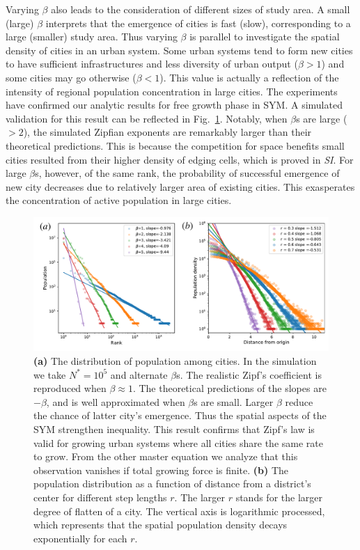 \documentclass[reprint,unsortedaddress,amsmath,amssymb,aps,prl,showkeys]{revtex4-2}
\begin{document}
Varying $\beta$ also leads to the consideration of different sizes of study area. A small (large) $\beta$ interprets that the emergence of cities is fast (slow), corresponding to a large (smaller) study area. %
Thus varying $\beta$ is parallel to investigate the spatial density of cities in an urban system. Some urban systems tend to form new cities to have sufficient infrastructures and less diversity of urban output\cite{batty2008size} ($\beta > 1$) and some cities may go otherwise ($\beta< 1$). This value is actually a reflection of the intensity of regional population concentration in large cities. The experiments have confirmed our analytic results for free growth phase in SYM. %
A simulated validation for this result can be reflected in Fig.~\ref{Fig2}. Notably, when $\beta$s are large ($>2$), the simulated Zipfian exponents are remarkably larger than their theoretical predictions. This is because the competition for space benefits small %
cities resulted from their higher density of edging cells, which is proved in \textit{SI}. For large $\beta$s, however, of the same rank, the probability of successful emergence of new city decreases due to relatively larger area of existing cities. This exasperates the concentration of active population in large cities.%
\begin{figure}[t]
	\centering
	\includegraphics[width = .99\linewidth]{pics/Zipf_Clark.pdf}
	\caption{\textbf{(a)} The distribution of population among cities. In the simulation we take $N^* = 10^5$ and alternate $\beta$s. The realistic Zipf's coefficient is reproduced when $\beta\approx 1$. The theoretical predictions of the slopes are $-\beta$, and is well approximated when $\beta$s are small. Larger $\beta$ reduce the chance of latter city's emergence. Thus the spatial aspects of the SYM strengthen inequality. This result confirms that Zipf's law is valid for growing urban systems where all cities share the same rate to grow. From the other master equation we analyze that this observation vanishes if total growing force is finite. \textbf{(b)} The population distribution as a function of distance from a district's center for different step lengths $r$. The larger $r$ stands for the larger degree of flatten of a city. The vertical axis is logarithmic processed, which represents that the spatial population density decays exponentially for each $r$.}
	\label{Fig2}
\end{figure}
\end{document}
